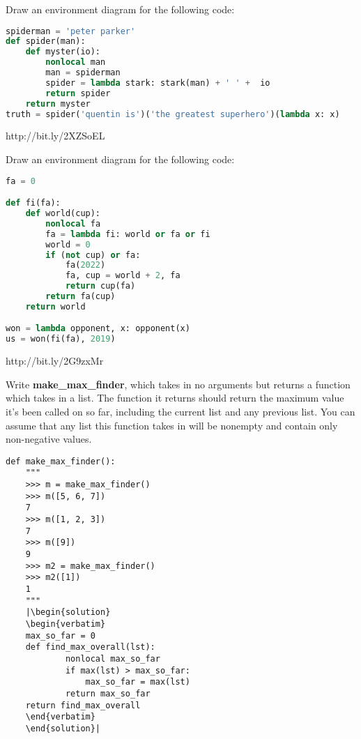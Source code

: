 \question
Draw an environment diagram for the following code:
\begin{lstlisting}[language=Python]
spiderman = 'peter parker'
def spider(man):
    def myster(io):
        nonlocal man
        man = spiderman
        spider = lambda stark: stark(man) + ' ' +  io
        return spider
    return myster
truth = spider('quentin is')('the greatest superhero')(lambda x: x)
\end{lstlisting}

\begin{solution}
http://bit.ly/2XZSoEL
\end{solution}
\newpage


\question
Draw an environment diagram for the following code:
\begin{lstlisting}[language=Python]
fa = 0

def fi(fa):
    def world(cup):
        nonlocal fa
        fa = lambda fi: world or fa or fi
        world = 0
        if (not cup) or fa:
            fa(2022)
            fa, cup = world + 2, fa
            return cup(fa)
        return fa(cup)
    return world

won = lambda opponent, x: opponent(x)
us = won(fi(fa), 2019)
\end{lstlisting}

\begin{solution}
http://bit.ly/2G9zxMr
\end{solution}
\newpage

\question
Write \textbf{make\_max\_finder}, which takes in no arguments but returns a function which takes in a list. The function it returns should return the maximum value it's been called on so far, including the current list and any previous list. You can assume that any list this function takes in will be nonempty and contain only non-negative values.

\begin{lstlisting}
def make_max_finder():
    """ 
	>>> m = make_max_finder()
	>>> m([5, 6, 7])
	7
	>>> m([1, 2, 3])
	7
	>>> m([9])
	9
	>>> m2 = make_max_finder()
	>>> m2([1])
	1
	"""
    |\begin{solution}
    \begin{verbatim}
    max_so_far = 0
    def find_max_overall(lst): 
	        nonlocal max_so_far
	        if max(lst) > max_so_far: 
	            max_so_far = max(lst)
	        return max_so_far
    return find_max_overall
    \end{verbatim}
    \end{solution}|
\end{lstlisting}
\newpage

